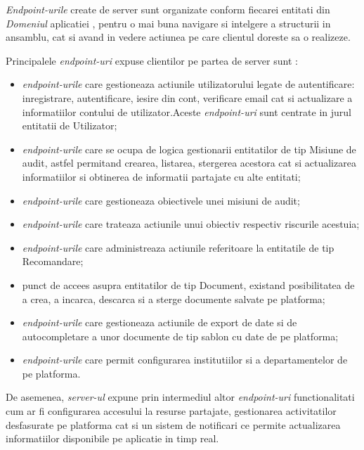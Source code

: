 \textit{Endpoint-urile} create de server sunt organizate conform fiecarei entitati din \textit{Domeniul} aplicatiei , pentru o mai buna navigare si intelgere a structurii in ansamblu, cat si avand in vedere actiunea pe care clientul doreste sa o realizeze.

Principalele \textit{endpoint-uri} expuse clientilor pe partea de server sunt :

\begin{itemize}
	
	\item \textit{endpoint-urile} care gestioneaza actiunile utilizatorului legate de autentificare: inregistrare, autentificare, iesire din cont, verificare email cat si actualizare a informatiilor contului de utilizator.Aceste \textit{endpoint-uri} sunt centrate in jurul entitatii de Utilizator;
	
	\item \textit{endpoint-urile} care se ocupa de logica gestionarii entitatilor de tip Misiune de audit, astfel permitand crearea, listarea, stergerea acestora cat si actualizarea informatiilor si obtinerea de informatii partajate cu alte entitati;
	
	\item \textit{endpoint-urile} care gestioneaza obiectivele unei misiuni de audit;
	
	\item \textit{endpoint-urile} care trateaza actiunile unui obiectiv respectiv riscurile acestuia;
	
	\item \textit{endpoint-urile} care administreaza actiunile referitoare la entitatile de tip Recomandare;
	
	\item punct de accees asupra entitatilor de tip Document, existand posibilitatea de a crea, a incarca, descarca si a sterge documente salvate pe platforma;
	
	\item \textit{endpoint-urile} care gestioneaza actiunile de export de date si de autocompletare a unor documente de tip sablon cu date de pe platforma;
	
	\item \textit{endpoint-urile} care permit configurarea institutiilor si a departamentelor de pe platforma.
	
\end{itemize} 

De asemenea, \textit{server-ul} expune prin intermediul altor \textit{ endpoint-uri} functionalitati cum ar fi configurarea accesului la resurse partajate, gestionarea activitatilor desfasurate pe platforma cat si un sistem de notificari ce permite actualizarea informatiilor disponibile pe aplicatie in timp real.


